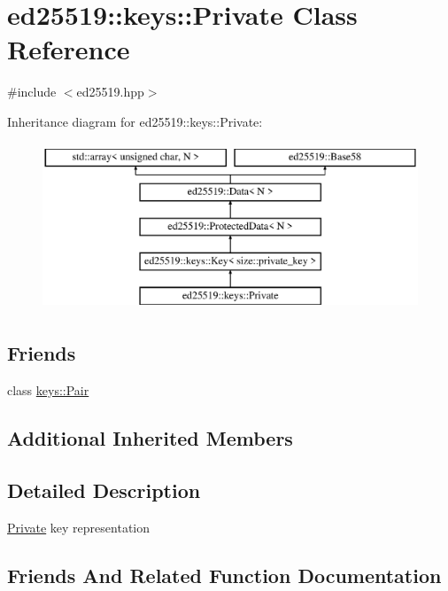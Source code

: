 \hypertarget{classed25519_1_1keys_1_1_private}{}\section{ed25519\+:\+:keys\+:\+:Private Class Reference}
\label{classed25519_1_1keys_1_1_private}


{\ttfamily \#include $<$ed25519.\+hpp$>$}

Inheritance diagram for ed25519\+:\+:keys\+:\+:Private\+:\begin{figure}[H]
\begin{center}
\leavevmode
\includegraphics[height=5.000000cm]{classed25519_1_1keys_1_1_private}
\end{center}
\end{figure}
\subsection*{Friends}
\begin{DoxyCompactItemize}
\item 
class \mbox{\hyperlink{classed25519_1_1keys_1_1_private_ad89670fe663c8c8526b69b1bc6a87c19}{keys\+::\+Pair}}
\end{DoxyCompactItemize}
\subsection*{Additional Inherited Members}


\subsection{Detailed Description}
\mbox{\hyperlink{classed25519_1_1keys_1_1_private}{Private}} key representation 

\subsection{Friends And Related Function Documentation}
\mbox{\label{classed25519_1_1keys_1_1_private_ad89670fe663c8c8526b69b1bc6a87c19}} 
